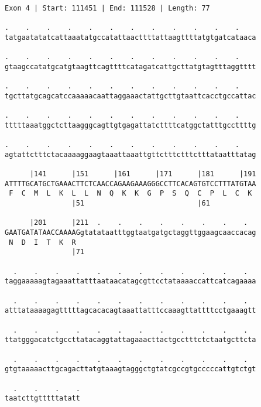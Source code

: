 \documentclass{article}
\begin{document}
\begin{Verbatim}[fontfamily=courier]
Exon 4 | Start: 111451 | End: 111528 | Length: 77

.    .    .    .    .    .    .    .    .    .    .    .    
tatgaatatatcattaaatatgccatattaacttttattaagttttatgtgatcataaca

.    .    .    .    .    .    .    .    .    .    .    .    
gtaagccatatgcatgtaagttcagttttcatagatcattgcttatgtagtttaggtttt

.    .    .    .    .    .    .    .    .    .    .    .    
tgcttatgcagcatccaaaaacaattaggaaactattgcttgtaattcacctgccattac

.    .    .    .    .    .    .    .    .    .    .    .    
tttttaaatggctcttaagggcagttgtgagattatcttttcatggctatttgccttttg

.    .    .    .    .    .    .    .    .    .    .    .    
agtattctttctacaaaaggaagtaaattaaattgttctttctttctttataatttatag

      |141      |151      |161      |171      |181      |191
ATTTTGCATGCTGAAACTTCTCAACCAGAAGAAAGGGCCTTCACAGTGTCCTTTATGTAA
 F  C  M  L  K  L  L  N  Q  K  K  G  P  S  Q  C  P  L  C  K 
                |51                           |61           

      |201      |211  .    .    .    .    .    .    .    .  
GAATGATATAACCAAAAGgtatataatttggtaatgatgctaggttggaagcaaccacag
 N  D  I  T  K  R                                           
                |71                                         

  .    .    .    .    .    .    .    .    .    .    .    .  
taggaaaaagtagaaattatttaataacatagcgttcctataaaaccattcatcagaaaa

  .    .    .    .    .    .    .    .    .    .    .    .  
atttataaaagagtttttagcacacagtaaattatttccaaagttattttcctgaaagtt

  .    .    .    .    .    .    .    .    .    .    .    .  
ttatgggacatctgccttatacaggtattagaaacttactgcctttctctaatgcttcta

  .    .    .    .    .    .    .    .    .    .    .    .  
gtgtaaaaacttgcagacttatgtaaagtagggctgtatcgccgtgcccccattgtctgt

  .    .    .    .
taatcttgtttttatatt
\end{Verbatim}
\newpage
\end{document}
